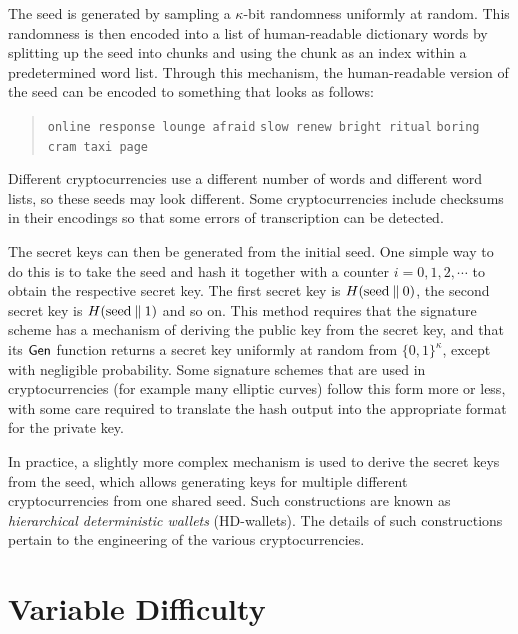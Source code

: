 The seed is generated by sampling a $\kappa$-bit randomness uniformly at
random. This randomness is then encoded into a list of human-readable
dictionary words by splitting up the seed into chunks and using the chunk
as an index within a predetermined word list. Through this mechanism,
the human-readable version of the seed can be encoded to something that
looks as follows:

\begin{quote}
\texttt{online response lounge afraid}
\texttt{slow renew bright ritual}
\texttt{boring cram taxi page}
\end{quote}

Different cryptocurrencies use a different number of words and different
word lists, so these seeds may look different. Some cryptocurrencies include
checksums in their encodings so that some errors of transcription can be
detected.

The secret keys can then be generated from the initial seed. One simple way to do
this is to take the seed and hash it together with a counter $i = 0, 1, 2, \cdots$
to obtain the respective secret key. The first secret key is $H(\mathrm{seed} \mathbin{\|} 0)$,
the second secret key is $H(\mathrm{seed} \mathbin{\|} 1)$ and so on.
This method requires that the signature scheme has a mechanism of deriving
the public key from the secret key, and that its $\mathsf{Gen}$ function returns a
secret key uniformly at random from $\{0, 1\}^\kappa$, except with negligible
probability. Some signature schemes that are used in cryptocurrencies (for example
many elliptic curves) follow this form more or less, with some care required to
translate the hash output into the appropriate format for the private key.

In practice, a slightly more complex mechanism is used to derive the secret keys from
the seed, which allows generating keys for multiple different cryptocurrencies from
one shared seed. Such constructions are known as \emph{hierarchical deterministic wallets}
(HD-wallets). The details of such constructions
pertain to the engineering of the various cryptocurrencies.


\section{Variable Difficulty}

